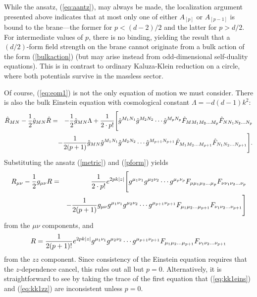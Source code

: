 \documentclass[a4paper,12pt]{article}
\def\fft#1#2{{#1\over#2}}
\begin{document}
While the ansatz, (\ref{eq:aantz}), may always be made, the localization
argument presented above indicates that at most only one of either $A_{[p]}$
or $A_{[p-1]}$ is bound to the brane---the former for $p<(d-2)/2$ and the
latter for $p>d/2$.  For intermediate values of $p$, there is no binding,
yielding the result that a $(d/2)$-form field strength on the brane cannot
originate from a bulk action of the form (\ref{bulkaction}) (but may arise
instead from odd-dimensional self-duality equations).  This is in contrast
to ordinary Kaluza-Klein reduction on a circle, where both potentials
survive in the massless sector.

Of course, (\ref{eq:eom1}) is not the only equation of motion we must
consider. There is also the bulk Einstein equation with cosmological
constant $\Lambda=-d(d-1)k^2$:
%
\begin{eqnarray}
{\hat R}_{MN}-\frac{1}{2}{\hat g}_{MN}\hat R&=&-\fft12{\hat g}_{MN}\Lambda
+\fft1{2\cdot p!}\Biggl[\hat g^{M_{1}N_{1}}\hat g^{M_{2}N_{2}}\cdots
\hat g^{M_{p}N_{p}}
{\hat F}_{MM_{1}M_{2}\ldots M_{p}}
{\hat F}_{NN_{1}N_{2}\ldots N_{p}}\nonumber\\
&&\kern-1em-\frac{1}{2(p+1)}{\hat g}_{MN}
\hat g^{M_{1}N_{1}}\hat g^{M_{2}N_{2}}\cdots \hat g^{M_{p+1}N_{p+1}}
{\hat F}_{M_{1}M_{2}\ldots M_{p+1}}
{\hat F}_{N_{1}N_{2}\ldots N_{p+1}}\Biggr].\nonumber\\
\end{eqnarray}
%
Substituting the ansatz (\ref{metric}) and (\ref{pform}) yields
%
\begin{eqnarray}
\label{eq:kk1eins}
{R}_{\mu\nu}-\frac{1}{2}{g}_{\mu\nu}R&=&\fft1{2\cdot p!}
e^{2pk|z|}\Biggl[g^{\mu_{1}\nu_{1}}g^{\mu_{2}\nu_{2}}\cdots g^{\mu_{p}\nu_{p}}
{F}_{\mu\mu_{1}\mu_{2}\ldots \mu_{p}}
{F}_{\nu\nu_{1}\nu_{2}\ldots \nu_{p}}\nonumber\\
&&-\frac{1}{2(p+1)}{g}_{\mu\nu}
g^{\mu_{1}\nu_{1}}g^{\mu_{2}\nu_{2}}\cdots g^{\mu_{p+1}\nu_{p+1}}
{F}_{\mu_{1}\mu_{2}\ldots \mu_{p+1}}
{F}_{\nu_{1}\nu_{2}\ldots \nu_{p+1}}\Biggr]
\end{eqnarray}
%
from the $\mu\nu$ components, and
%
\begin{equation}
\label{eq:kk1zz}
R=\fft1{2(p+1)!}e^{2pk|z|}
g^{\mu_{1}\nu_{1}}g^{\mu_{2}\nu_{2}}\cdots g^{\mu_{p+1}\nu_{p+1}}
{F}_{\mu_{1}\mu_{2}\ldots \mu_{p+1}}
{F}_{\nu_{1}\nu_{2}\ldots \nu_{p+1}}
\end{equation}
%
from the $zz$ component.
Since consistency of the Einstein equation requires that the
$z$-dependence cancel, this rules out all but $p=0$.  Alternatively, it is
straightforward to see by taking the trace of the first equation that
(\ref{eq:kk1eins}) and (\ref{eq:kk1zz}) are inconsistent unless $p=0$.
\end{document}
